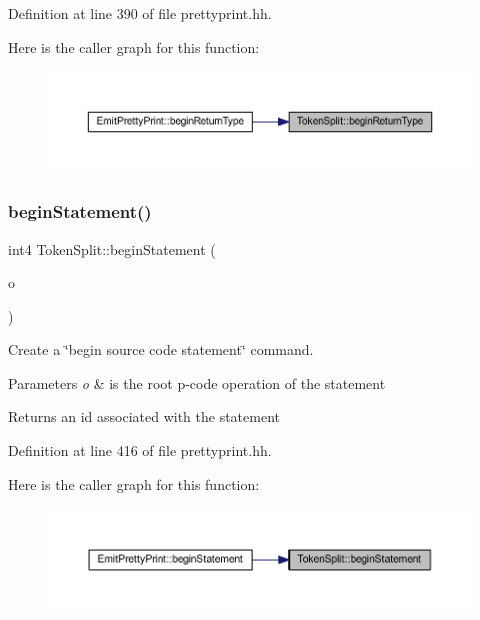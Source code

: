 Definition at line 390 of file prettyprint.\+hh.

Here is the caller graph for this function\+:
\nopagebreak
\begin{figure}[H]
\begin{center}
\leavevmode
\includegraphics[width=350pt]{class_token_split_a2e4f04db795faf9a88e4e575744c65eb_icgraph}
\end{center}
\end{figure}
\mbox{\label{class_token_split_a09b86fe5f1a6f82681ae9b508969cf77}} 
\subsubsection{\texorpdfstring{beginStatement()}{beginStatement()}}
{\footnotesize\ttfamily int4 Token\+Split\+::begin\+Statement (\begin{DoxyParamCaption}\item[{const \mbox{\hyperlink{class_pcode_op}{Pcode\+Op}} $\ast$}]{o }\end{DoxyParamCaption})\hspace{0.3cm}{\ttfamily [inline]}}



Create a \char`\"{}begin source code statement\char`\"{} command. 


\begin{DoxyParams}{Parameters}
{\em o} & is the root p-\/code operation of the statement \\
\hline
\end{DoxyParams}
\begin{DoxyReturn}{Returns}
an id associated with the statement 
\end{DoxyReturn}


Definition at line 416 of file prettyprint.\+hh.

Here is the caller graph for this function\+:
\nopagebreak
\begin{figure}[H]
\begin{center}
\leavevmode
\includegraphics[width=350pt]{class_token_split_a09b86fe5f1a6f82681ae9b508969cf77_icgraph}
\end{center}
\end{figure}
\mbox{\label{class_token_split_a45ce997b26f444d7ddb42e57693f2907}} 
